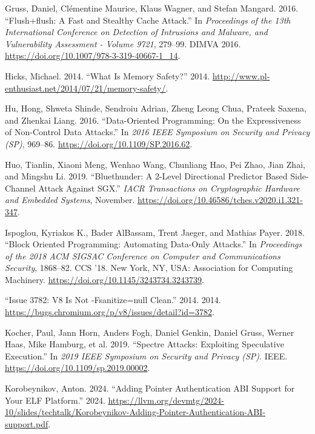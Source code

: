 \documentclass[
  a4paper,
]{report}
\newlength{\cslhangindent}
\newenvironment{CSLReferences}[2] %
{\begin{list}{}{%
	\setlength{\itemindent}{0pt}
	\setlength{\leftmargin}{0pt}
	\setlength{\parsep}{0pt}
	\ifodd #1
	\setlength{\leftmargin}{\cslhangindent}
	\setlength{\itemindent}{-1\cslhangindent}
	\fi
	\setlength{\itemsep}{#2\baselineskip}}}
{\end{list}}
\begin{document}
\begin{CSLReferences}{1}{0}
Gruss, Daniel, Clémentine Maurice, Klaus Wagner, and Stefan Mangard.
2016. {``Flush+flush: A Fast and Stealthy Cache Attack.''} In
\emph{Proceedings of the 13th International Conference on Detection of
Intrusions and Malware, and Vulnerability Assessment - Volume 9721},
279--99. DIMVA 2016. \url{https://doi.org/10.1007/978-3-319-40667-1_14}.

Hicks, Michael. 2014. {``What Is Memory Safety?''} 2014.
\url{http://www.pl-enthusiast.net/2014/07/21/memory-safety/}.

Hu, Hong, Shweta Shinde, Sendroiu Adrian, Zheng Leong Chua, Prateek
Saxena, and Zhenkai Liang. 2016. {``Data-Oriented Programming: On the
Expressiveness of Non-Control Data Attacks.''} In \emph{2016 IEEE
Symposium on Security and Privacy (SP)}, 969--86.
\url{https://doi.org/10.1109/SP.2016.62}.

Huo, Tianlin, Xiaoni Meng, Wenhao Wang, Chunliang Hao, Pei Zhao, Jian
Zhai, and Mingshu Li. 2019. {``Bluethunder: A 2-Level Directional
Predictor Based Side-Channel Attack Against {SGX}.''} \emph{{IACR}
Transactions on Cryptographic Hardware and Embedded Systems}, November.
\url{https://doi.org/10.46586/tches.v2020.i1.321-347}.

Ispoglou, Kyriakos K., Bader AlBassam, Trent Jaeger, and Mathias Payer.
2018. {``Block Oriented Programming: Automating Data-Only Attacks.''} In
\emph{Proceedings of the 2018 ACM SIGSAC Conference on Computer and
Communications Security}, 1868--82. CCS '18. New York, NY, USA:
Association for Computing Machinery.
\url{https://doi.org/10.1145/3243734.3243739}.

{``Issue 3782: V8 Is Not -Fsanitize=null Clean.''} 2014. 2014.
\url{https://bugs.chromium.org/p/v8/issues/detail?id=3782}.

Kocher, Paul, Jann Horn, Anders Fogh, Daniel Genkin, Daniel Gruss,
Werner Haas, Mike Hamburg, et al. 2019. {``Spectre Attacks: Exploiting
Speculative Execution.''} In \emph{2019 {IEEE} Symposium on Security and
Privacy ({SP})}. {IEEE}. \url{https://doi.org/10.1109/sp.2019.00002}.

Korobeynikov, Anton. 2024. {``Adding Pointer Authentication ABI Support
for Your ELF Platform.''} 2024.
\url{https://llvm.org/devmtg/2024-10/slides/techtalk/Korobeynikov-Adding-Pointer-Authentication-ABI-support.pdf}.


\end{CSLReferences}
\end{document}
